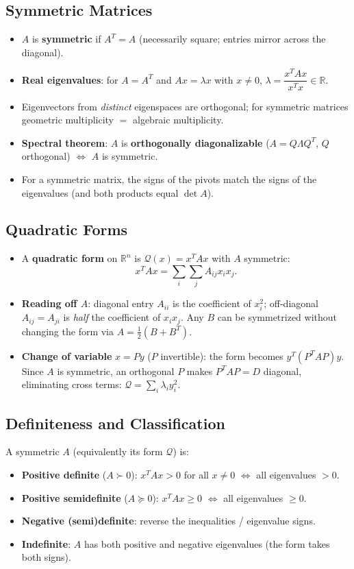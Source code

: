 \documentclass[hidelinks]{article}
\begin{document}
\subsection{Symmetric Matrices}
\begin{itemize}
    \item $A$ is \textbf{symmetric} if $A^T = A$ (necessarily square; entries mirror across the diagonal).
    \item \textbf{Real eigenvalues}: for $A=A^T$ and $Ax=\lambda x$ with $x\neq 0$, $\lambda = \dfrac{x^TAx}{x^Tx}\in\mathbb{R}$.
    \item Eigenvectors from \emph{distinct} eigenspaces are orthogonal; for symmetric matrices geometric multiplicity $=$ algebraic multiplicity.
    \item \textbf{Spectral theorem}: $A$ is \textbf{orthogonally diagonalizable} ($A = Q\Lambda Q^T$, $Q$ orthogonal) $\iff$ $A$ is symmetric.
    \item For a symmetric matrix, the signs of the pivots match the signs of the eigenvalues (and both products equal $\det A$).
\end{itemize}

\subsection{Quadratic Forms}
\begin{itemize}
    \item A \textbf{quadratic form} on $\mathbb{R}^n$ is $\mathcal Q(x) = x^TAx$ with $A$ symmetric:
    \[
        x^TAx = \sum_{i}\sum_j A_{ij}x_ix_j.
    \]
    \item \textbf{Reading off $A$}: diagonal entry $A_{ii}$ is the coefficient of $x_i^2$; off-diagonal $A_{ij}=A_{ji}$ is \emph{half} the coefficient of $x_ix_j$. Any $B$ can be symmetrized without changing the form via $A = \tfrac12(B+B^T)$.
    \item \textbf{Change of variable} $x = Py$ ($P$ invertible): the form becomes $y^T(P^TAP)y$. Since $A$ is symmetric, an orthogonal $P$ makes $P^TAP = D$ diagonal, eliminating cross terms: $\mathcal Q = \sum_i \lambda_i y_i^2$.
\end{itemize}

\subsection{Definiteness and Classification}
A symmetric $A$ (equivalently its form $\mathcal Q$) is:
\begin{itemize}
    \item \textbf{Positive definite} ($A\succ 0$): $x^TAx > 0$ for all $x\neq 0$ $\iff$ all eigenvalues $> 0$.
    \item \textbf{Positive semidefinite} ($A\succeq 0$): $x^TAx \ge 0$ $\iff$ all eigenvalues $\ge 0$.
    \item \textbf{Negative (semi)definite}: reverse the inequalities / eigenvalue signs.
    \item \textbf{Indefinite}: $A$ has both positive and negative eigenvalues (the form takes both signs).
\end{itemize}
\end{document}
